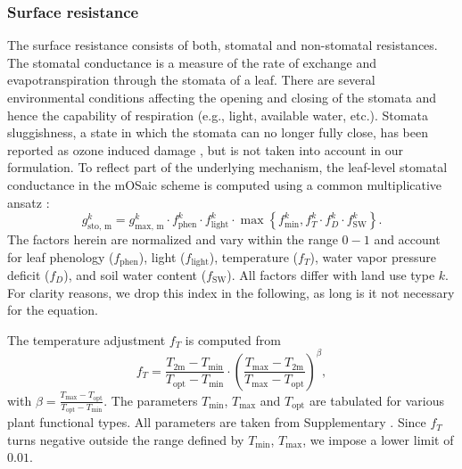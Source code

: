 \documentclass[gmd, manuscript]{copernicus}
\begin{document}
\subsubsection{Surface resistance}
\label{subsubsec:Rc}
The surface resistance consists of both, stomatal and non-stomatal resistances.\\ 
The stomatal conductance is a measure of the rate of  exchange and evapotranspiration through the stomata of a leaf. There are several environmental conditions affecting the opening and closing of the stomata and hence the capability of respiration (e.g., light, available water, etc.). Stomata sluggishness, a state in which the stomata can no longer fully close, has been reported as ozone induced damage \citep{SR:Hoshika2015}, but is not taken into account in our formulation. To reflect part of the underlying mechanism, the leaf-level stomatal conductance in the mOSaic scheme is computed using a common multiplicative ansatz \citep{BallBerry1987, ICP:MappingManual2017}:
%
\begin{equation}
  g^k_\text{sto, m} = g^k_\text{max, m} \cdot f^k_\text{phen} \cdot f^k_\text{light} \cdot \max{\left\{f^k_\text{min}, f^k_T \cdot f^k_D \cdot f^k_\text{SW}\right\}}.
  \label{eq:stomatal}
\end{equation}
%
The factors herein are normalized and vary within the range $0-1$ and account for leaf phenology ($f_\text{phen}$), light ($f_\text{light}$), temperature ($f_T$), water vapor pressure deficit ($f_D$), and soil water content ($f_\text{SW}$). All factors differ with land use type $k$. For clarity reasons, we drop this index in the following, as long is it not necessary for the equation.

The temperature adjustment $f_T$ is computed from
%
\begin{equation}
  f_T = \frac{T_\text{2m}-T_\text{min}}{T_\text{opt}-T_\text{min}} \cdot \left(\frac{T_{\text{max}}-T_\text{2m}}{T_{\text{max}}-T_\text{opt}}\right)^\beta, 
\end{equation}
with $\beta = \frac{T_\text{max}-T_\text{opt}}{T_\text{opt}-T_\text{min}}$. The parameters $T_\text{min}$, $T_\text{max}$ and $T_\text{opt}$ are tabulated for various plant functional types. All parameters are taken from Supplementary \citet[][Tables S16, S19]{ACP:Simpson2012}. Since $f_T$ turns negative outside the range defined by $T_\text{min}$, $T_\text{max}$, we impose a lower limit of $0.01$.
\end{document}
